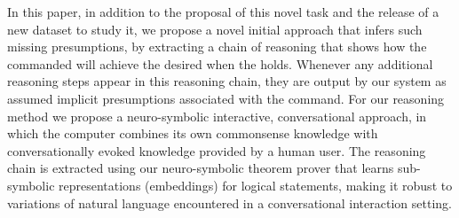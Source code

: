 

In this paper, in addition to the proposal of this novel task and the release of a new dataset to study it, we propose a novel initial approach that infers such missing presumptions, by
extracting %
a chain of reasoning that shows how the commanded \textAction will achieve the desired \textGoal when the \textState holds. Whenever any additional reasoning steps appear in this reasoning chain, 
they are output by our system as assumed implicit presumptions associated with the command. For our reasoning method we propose a neuro-symbolic interactive, conversational approach, in which the computer combines its own commonsense knowledge with conversationally evoked knowledge provided by a human user. The reasoning chain is extracted using our neuro-symbolic theorem prover that learns sub-symbolic representations (embeddings) for logical statements, making it robust to variations of natural language encountered in a conversational interaction setting. 


